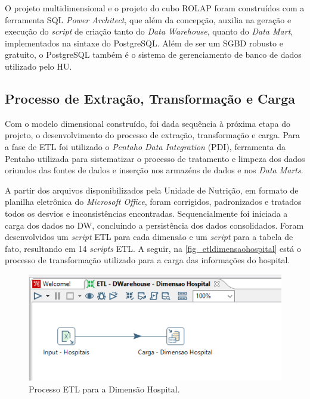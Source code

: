 O projeto multidimensional e o projeto do cubo ROLAP foram construídos com a ferramenta SQL \textit{Power Architect}, que além da concepção, auxilia na geração e execução do \textit{script} de criação tanto do \textit{Data Warehouse}, quanto do \textit{Data Mart}, implementados na sintaxe do PostgreSQL. Além de ser um SGBD robusto e gratuito, o PostgreSQL também é o sistema de gerenciamento de banco de dados utilizado pelo HU. 

\subsection{Processo de Extração, Transformação e Carga}
Com o modelo dimensional construído, foi dada sequência à próxima etapa do projeto, o desenvolvimento do processo de extração, transformação e carga. Para a fase de ETL foi utilizado o \textit{Pentaho Data Integration} (PDI), ferramenta da Pentaho utilizada para sistematizar o processo de tratamento e limpeza dos dados oriundos das fontes de dados e inserção nos armazéns de dados e nos \textit{Data Marts}.

A partir dos arquivos disponibilizados pela Unidade de Nutrição, em formato de planilha eletrônica do \textit{Microsoft Office}, foram corrigidos, padronizados e tratados todos os desvios e inconsistências encontradas. Sequencialmente foi iniciada a carga dos dados no DW, concluindo a persistência dos dados consolidados. Foram desenvolvidos um \textit{script} ETL para cada dimensão e um \textit{script} para a tabela de fato, resultando em 14 \textit{scripts} ETL. A seguir, na \autoref{fig_etldimensaohospital} está o processo de transformação utilizado para a carga das informações do hospital. 

\begin{figure}[htb]
	\caption{\label{fig_etldimensaohospital}Processo ETL para a Dimensão Hospital.}
	\begin{center}
	    \includegraphics[scale=0.8]{Imagens/figura - etl dw hospital.png}
	\end{center}
\end{figure}

